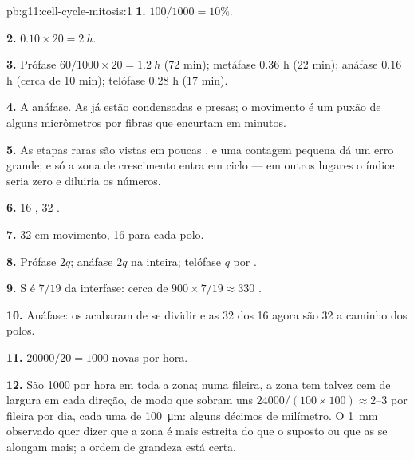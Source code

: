 \begin{solution}{pb:g11:cell-cycle-mitosis:1}
\textbf{1.} $100/1000 = 10\%$.

\textbf{2.} $0.10 \times 20 = \qty{2}{h}$.

\textbf{3.} Prófase $60/1000 \times 20 = \qty{1.2}{h}$ (72 min);
metáfase $0.36$ h (22 min); anáfase $0.16$ h (cerca de 10 min);
telófase $0.28$ h (17 min).

\textbf{4.} A anáfase. As  já estão condensadas e presas; o
movimento é um puxão de alguns micrômetros por fibras que encurtam em
minutos.

\textbf{5.} As etapas raras são vistas em poucas , e uma
contagem pequena dá um erro grande; e só a zona de crescimento entra em
ciclo --- em outros lugares o índice seria zero e diluiria os números.

\textbf{6.} 16 , 32 .

\textbf{7.} 32  em movimento, 16 para cada polo.

\textbf{8.} Prófase $2q$; anáfase $2q$ na  inteira; telófase $q$
por .

\textbf{9.} S é $7/19$ da interfase: cerca de $900 \times 7/19 \approx
330$ .

\textbf{10.} Anáfase: os  acabaram de se dividir e as 32
 dos 16  agora são 32  a caminho dos
polos.

\textbf{11.} $\num{20000}/20 = 1000$  novas por hora.

\textbf{12.} São 1000  por hora em toda a zona; numa fileira, a
zona tem talvez cem  de largura em cada direção, de modo que
sobram uns $\num{24000}/(100 \times 100) \approx 2$--3  por
fileira por dia, cada uma de \qty{100}{\micro m}: alguns décimos de
milímetro. O \qty{1}{mm} observado quer dizer que a zona é mais estreita
do que o suposto ou que as  se alongam mais; a ordem de grandeza
está certa.


\end{solution}
